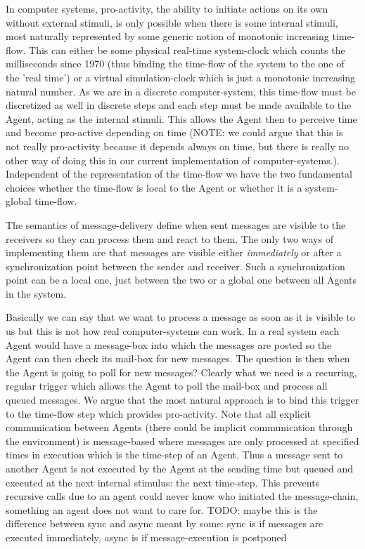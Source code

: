 In computer systems, pro-activity, the ability to initiate actions on its own without external stimuli, is only possible when there is some internal stimuli, most naturally represented by some generic notion of monotonic increasing time-flow. This can either be some physical real-time system-clock which counts the milliseconds since 1970 (thus binding the time-flow of the system to the one of the 'real time') or a virtual simulation-clock which is just a monotonic increasing natural number. As we are in a discrete computer-system, this time-flow must be discretized as well in discrete steps and each step must be made available to the Agent, acting as the internal stimuli. This allows the Agent then to perceive time and become pro-active depending on time (NOTE: we could argue that this is not really pro-activity because it depends always on time, but there is really no other way of doing this in our current implementation of computer-systems.). Independent of the representation of the time-flow we have the two fundamental choices whether the time-flow is local to the Agent or whether it is a system-global time-flow.

\medskip 

The semantics of message-delivery define when sent messages are visible to the receivers so they can process them and react to them. The only two ways of implementing them are that messages are visible either \textit{immediately} or after a synchronization point between the sender and receiver. Such a synchronization point can be a local one, just between the two or a global one between all Agents in the system.

\medskip 

Basically we can say that we want to process a message as soon as it is visible to us but this is not how real computer-systems can work. In a real system each Agent would have a message-box into which the messages are posted so the Agent can then check its mail-box for new messages. The question is then when the Agent is going to poll for new messages? Clearly what we need is a recurring, regular trigger which allows the Agent to poll the mail-box and process all queued messages. We argue that the most natural approach is to bind this trigger to the time-flow step which provides pro-activity. Note that all explicit communication between Agents (there could be implicit communication through the environment) is message-based where messages are only processed at specified times in execution which is the time-step of an Agent. Thus a message sent to another Agent is not executed by the Agent at the sending time but queued and executed at the next internal stimulus: the next time-step. This prevents recursive calls due to an agent could never know who initiated the message-chain, something an agent does not want to care for.
TODO: maybe this is the difference between sync and async meant by some: sync is if messages are executed immediately, async is if message-execution is postponed 

